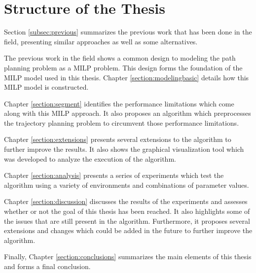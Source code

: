 
\section{Structure of the Thesis}
Section \ref{subsec:previous} summarizes the previous work that has been done in the field, presenting similar approaches as well as some  alternatives.
\par
The previous work in the field shows a common design to modeling the path planning problem as a MILP problem. This design forms the foundation of the MILP model used in this thesis. Chapter \ref{section:modelingbasic} details how this MILP model is constructed.
\par
Chapter \ref{section:segment} identifies the performance limitations which come along with this MILP approach. It also proposes an algorithm which preprocesses the trajectory planning problem to circumvent those performance limitations.
\par
Chapter \ref{section:extensions} presents several extensions to the algorithm to further improve the results. It also shows the graphical visualization tool which was developed to analyze the execution of the algorithm.
\par
Chapter \ref{section:analysis} presents a series of experiments which test the algorithm using a variety of environments and combinations of parameter values.
\par
Chapter \ref{section:discussion} discusses the results of the experiments and assesses whether or not the goal of this thesis has been reached. It also highlights some of the issues that are still present in the algorithm. Furthermore, it proposes several extensions and changes which could be added in the future to further improve the algorithm.
\par
Finally, Chapter \ref{section:conclusions} summarizes the main elements of this thesis and forms a final conclusion.

